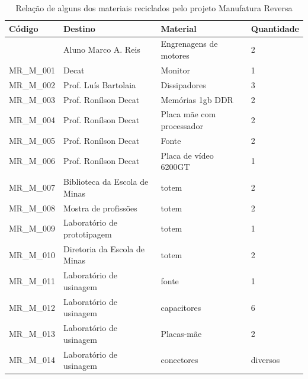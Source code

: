 \documentclass[
	12pt,				%
	openright,			%
	oneside,			%
	a4paper,			%
	english,			%
	spanish,			%
	brazil,				%
	]{abntex2}
\begin{document}
\begin{table}[H]
	\caption{Relação de alguns dos materiais reciclados pelo projeto Manufatura Reversa}
	\label{tabela:manufatura}
\begin{tabular}{|l|l|l|l|}
	\hline
	\textbf{Código} & \textbf{Destino}              & \textbf{Material}         & \textbf{Quantidade} \\ \hline
	& Aluno Marco A. Reis           & Engrenagens de motores    & 2                   \\ \hline
	MR\_M\_001      & Decat                         & Monitor                   & 1                   \\ \hline
	MR\_M\_002      & Prof. Luís  Bartolaia         & Dissipadores              & 3                   \\ \hline
	MR\_M\_003      & Prof. Ronílson Decat          & Memórias 1gb DDR          & 2                   \\ \hline
	MR\_M\_004      & Prof. Ronílson Decat          & Placa mãe com processador & 2                   \\ \hline
	MR\_M\_005      & Prof. Ronílson Decat          & Fonte                     & 2                   \\ \hline
	MR\_M\_006      & Prof. Ronílson Decat          & Placa de vídeo 6200GT     & 1                   \\ \hline
	MR\_M\_007      & Biblioteca da Escola de Minas & totem                     & 2                   \\ \hline
	MR\_M\_008      & Mostra de profissões          & totem                     & 2                   \\ \hline
	MR\_M\_009      & Laboratório de prototipagem   & totem                     & 1                   \\ \hline
	MR\_M\_010      & Diretoria da Escola de Minas  & totem                     & 2                   \\ \hline
	MR\_M\_011      & Laboratório de usinagem       & fonte                     & 1                   \\ \hline
	MR\_M\_012      & Laboratório de usinagem       & capacitores               & 6                   \\ \hline
	MR\_M\_013      & Laboratório de usinagem       & Placas-mãe                & 2                   \\ \hline
	MR\_M\_014      & Laboratório de usinagem       & conectores                & diversos            \\ \hline
\end{tabular}
\end{table}
\end{document}
